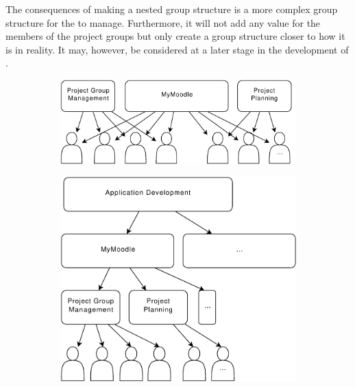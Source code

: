 The consequences of making a nested group structure is a more complex group structure for the \admpers{} to manage. 
Furthermore, it will not add any value for the members of the project groups but only create a group structure closer to how it is in reality. 
It may, however, be considered at a later stage in the development of \system{}.

\begin{figure}[htb]\centering%
        \begin{subfigure}[b]{0.45\textwidth}
                \centering
                \includegraphics[width=\textwidth]{images/FlatGroupStructure.pdf}
                \label{fig:groupstructure:flat}
        \end{subfigure}%
				\quad
        \begin{subfigure}[b]{0.45\textwidth}
                \centering
                \includegraphics[width=\textwidth]{images/RecursiveTreeStructure.pdf}
                \label{fig:groupstructure:rec}
        \end{subfigure}%
%
\label{fig:groupstructure}%
\end{figure}




